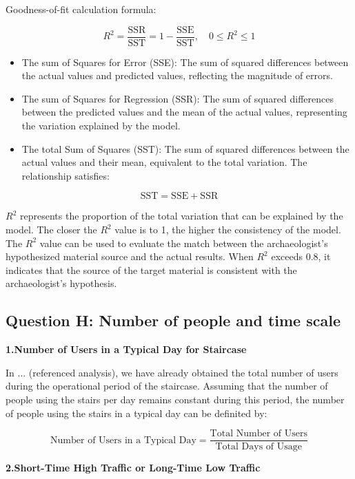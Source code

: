 \documentclass{mcmthesis}
\begin{document}
Goodness-of-fit calculation formula:


\[R^2 = \frac{\text{SSR}}{\text{SST}} = 1 - \frac{\text{SSE}}{\text{SST}}, \quad 0 \leq R^2 \leq 1 \]

\begin{itemize} 

\item The sum of Squares for Error (SSE): The sum of squared differences between the actual values and predicted values, reflecting the magnitude of errors. 

\item The sum of Squares for Regression (SSR): The sum of squared differences between the predicted values and the mean of the actual values, representing the variation explained by the model. 

\item The total Sum of Squares (SST): The sum of squared differences between the actual values and their mean, equivalent to the total variation. The relationship satisfies: 
\end{itemize}



\[\text{SST} = \text{SSE} + \text{SSR}\]

$R^2$ represents the proportion of the total variation that can be explained by the model. The closer the $R^2$ value is to 1, the higher the consistency of the model. The $R^2$ value can be used to evaluate the match between the archaeologist's hypothesized material source and the actual results. When $R^2$ exceeds 0.8, it indicates that the source of the target material is consistent with the archaeologist's hypothesis.


\subsection{Question H: Number of people and time scale}


\textbf{1.Number of Users in a Typical Day for Staircase }


In ... (referenced analysis), we have already obtained the total number of users during the operational period of the staircase. Assuming that the number of people using the stairs per day remains constant during this period, the number of people using the stairs in a typical day can be definited by:

\[\text{Number of Users in a Typical Day} = \frac{\text{Total Number of Users}}{\text{Total Days of Usage}}\]

\textbf{2.Short-Time High Traffic or Long-Time Low Traffic}
\end{document}
